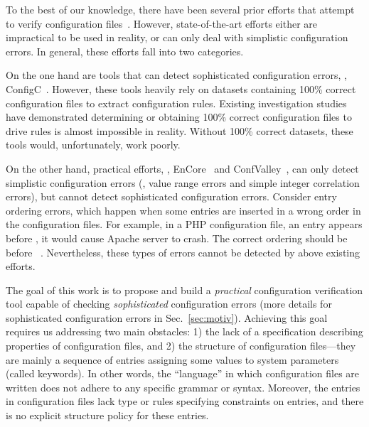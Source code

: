To the best of our knowledge, there have been several prior 
efforts that attempt to verify 
configuration files~\cite{santolucitoCAV, xu16early,
zhang14encore, huang15confvalley}.
However, state-of-the-art efforts either are impractical to be used
in reality, or can only deal with simplistic configuration errors.
In general, these efforts fall into two categories.

\squishlist

\item On the one hand are tools that can detect sophisticated 
configuration errors, \eg, ConfigC~\cite{santolucitoCAV}. 
However, these tools heavily rely on datasets containing 100\% 
correct configuration files to extract configuration rules.
Existing investigation studies~\cite{wang04automatic, yin11anempirical}
have demonstrated determining or obtaining 100\% correct configuration
files to drive rules is almost impossible in reality. 
Without 100\% correct datasets, these tools would, unfortunately, 
work poorly.

\item On the other hand, practical efforts, 
\eg, EnCore~\cite{zhang14encore} and
ConfValley~\cite{huang15confvalley}, can only 
detect simplistic configuration errors (\eg, value range errors 
and simple integer correlation errors), but cannot detect
sophisticated configuration errors. 
Consider entry ordering errors, 
which happen when some entries are inserted in a wrong order
in the configuration files. 
For example, in a PHP configuration file, 
an entry  appears 
before ,  
it would cause Apache server to crash. The correct ordering 
should be  before 
~\cite{yin11anempirical}.
Nevertheless, these types of errors cannot be detected by above existing
efforts.

\squishend

The goal of this work is to propose and build a {\em practical} 
configuration
verification tool capable of checking {\em sophisticated} 
configuration errors (more details
for sophisticated configuration errors in Sec.~\ref{sec:motiv}).
Achieving this goal requires us addressing two main obstacles:
1) the lack of a specification describing properties of configuration
files, and 2) the structure of configuration files---they are 
mainly a sequence of entries assigning some values to system
parameters (called keywords).
In other words, the ``language'' in which configuration 
files are written does not adhere to any specific grammar or syntax. 
Moreover, the entries in configuration files 
lack type or rules specifying constraints on entries, 
and there is no explicit structure policy for these entries.

